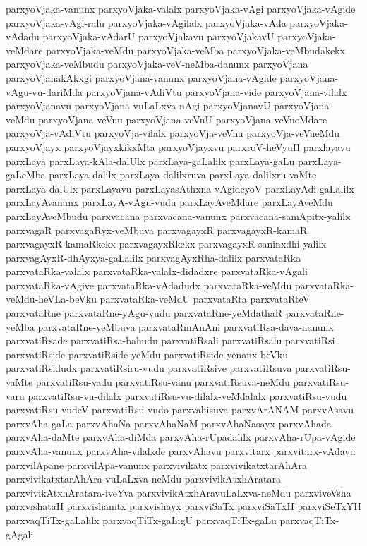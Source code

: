 {parxyoVjaka-vanunx
parxyoVjaka-valalx
parxyoVjaka-vAgi
parxyoVjaka-vAgide
parxyoVjaka-vAgi-ralu
parxyoVjaka-vAgilalx
parxyoVjaka-vAda
parxyoVjaka-vAdadu
parxyoVjaka-vAdarU
parxyoVjakavu
parxyoVjakavU
parxyoVjaka-veMdare
parxyoVjaka-veMdu
parxyoVjaka-veMba
parxyoVjaka-veMbudakekx
parxyoVjaka-veMbudu
parxyoVjaka-veV-neMba-danunx
parxyoVjana
parxyoVjanakAkxgi
parxyoVjana-vanunx
parxyoVjana-vAgide
parxyoVjana-vAgu-vu-dariMda
parxyoVjana-vAdiVtu
parxyoVjana-vide
parxyoVjana-vilalx
parxyoVjanavu
parxyoVjana-vuLaLxva-nAgi
parxyoVjanavU
parxyoVjana-veMdu
parxyoVjana-veVnu
parxyoVjana-veVnU
parxyoVjana-veVneMdare
parxyoVja-vAdiVtu
parxyoVja-vilalx
parxyoVja-veVnu
parxyoVja-veVneMdu
parxyoVjayx
parxyoVjayxkikxMta
parxyoVjayxvu
parxroV-heVyuH
parxlayavu
parxLaya
parxLaya-kAla-dalUlx
parxLaya-gaLalilx
parxLaya-gaLu
parxLaya-gaLeMba
parxLaya-dalilx
parxLaya-dalilxruva
parxLaya-dalilxru-vaMte
parxLaya-dalUlx
parxLayavu
parxLayasAthxna-vAgideyoV
parxLayAdi-gaLalilx
parxLayAvanunx
parxLayA-vAgu-vudu
parxLayAveMdare
parxLayAveMdu
parxLayAveMbudu
parxvacana
parxvacana-vanunx
parxvacana-samApitx-yalilx
parxvagaR
parxvagaRyx-veMbuva
parxvagayxR
parxvagayxR-kamaR
parxvagayxR-kamaRkekx
parxvagayxRkekx
parxvagayxR-saninxdhi-yalilx
parxvagAyxR-dhAyxya-gaLalilx
parxvagAyxRha-dalilx
parxvataRka
parxvataRka-valalx
parxvataRka-valalx-didadxre
parxvataRka-vAgali
parxvataRka-vAgive
parxvataRka-vAdadudx
parxvataRka-veMdu
parxvataRka-veMdu-heVLa-beVku
parxvataRka-veMdU
parxvataRta
parxvataRteV
parxvataRne
parxvataRne-yAgu-vudu
parxvataRne-yeMdathaR
parxvataRne-yeMba
parxvataRne-yeMbuva
parxvataRmAnAni
parxvatiRsa-dava-nanunx
parxvatiRsade
parxvatiRsa-bahudu
parxvatiRsali
parxvatiRsalu
parxvatiRsi
parxvatiRside
parxvatiRside-yeMdu
parxvatiRside-yenanx-beVku
parxvatiRsidudx
parxvatiRsiru-vudu
parxvatiRsive
parxvatiRsuva
parxvatiRsu-vaMte
parxvatiRsu-vadu
parxvatiRsu-vanu
parxvatiRsuva-neMdu
parxvatiRsu-varu
parxvatiRsu-vu-dilalx
parxvatiRsu-vu-dilalx-veMdalalx
parxvatiRsu-vudu
parxvatiRsu-vudeV
parxvatiRsu-vudo
parxvahisuva
parxvArANAM
parxvAsavu
parxvAha-gaLa
parxvAhaNa
parxvAhaNaM
parxvAhaNasayx
parxvAhada
parxvAha-daMte
parxvAha-diMda
parxvAha-rUpadalilx
parxvAha-rUpa-vAgide
parxvAha-vanunx
parxvAha-vilalxde
parxvAhavu
parxvitarx
parxvitarx-vAdavu
parxvilApane
parxvilApa-vanunx
parxvivikatx
parxvivikatxtarAhAra
parxvivikatxtarAhAra-vuLaLxva-neMdu
parxvivikAtxhAratara
parxvivikAtxhAratara-iveYva
parxvivikAtxhAravuLaLxva-neMdu
parxviveVsha
parxvishataH
parxvishanitx
parxvishayx
parxviSaTx
parxviSaTxH
parxviSeTxYH
parxvaqTiTx-gaLalilx
parxvaqTiTx-gaLigU
parxvaqTiTx-gaLu
parxvaqTiTx-gAgali
}
